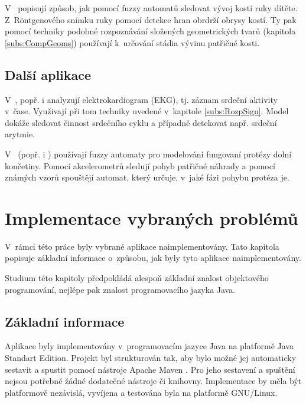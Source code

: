 V~\cite{PatPal-FuzGraSynRecSkeMatXra} popisují způsob, jak pomocí fuzzy automatů sledovat vývoj kostí ruky dítěte. Z~R\"{o}ntgenového snímku ruky pomocí detekce hran obrdrží obrysy kostí. Ty pak pomocí techniky podobné rozpoznávání složených geometrických tvarů (kapitola \ref{subs:CompGeoms}) používají k~určování stádia vývinu patřičné kosti.

\subsection{Další aplikace} \label{subs:BioMedRest}
V~\cite{PedGac-LeaFuzzAut}, popř. i \cite{RigTza-FuzAutFauDia} analyzují elektrokardiogram (EKG), tj. záznam srdeční aktivity v~čase. Využivají při tom techniky uvedené v~kapitole \ref{subs:RozpSign}. Model dokáže sledovat činnost srdečního cyklu a případně detekovat např. srdeční arytmie.


V~\cite{Alv-HumGaiModUsGenFuzFinStaMac} (popř. i \cite{AlvTri-ComModQuaPerSig})
používají fuzzy automaty pro modelování fungovaní protézy dolní končetiny. Pomocí akcelerometrů sledují pohyb patřičné náhrady a pomocí známých vzorů spouštějí automat, který určuje, v~jaké fázi pohybu protéza je.

\section{Implementace vybraných problémů}
V~rámci této práce byly vybrané aplikace naimplementovány. Tato kapitola popisuje základní informace o~způsobu, jak byly tyto aplikace naimplementovány.

Studium této kapitoly předpokládá alespoň základní znalost objektového programování, nejlépe pak znalost programovacího jazyka Java.

\subsection{Základní informace}
Aplikace byly implementovány v~programovacím jazyce Java na platformě Java Standart Edition. Projekt byl strukturován tak, aby bylo možné jej automaticky sestavit a spustit pomocí nástroje Apache Maven \cite{web-Maven}. Pro jeho sestavení a spuštění nejsou potřebné žádné dodatečné nástroje či knihovny. Implementace by měla být platformově nezávislá, vyvíjena a testována byla na platformě GNU/Linux.


